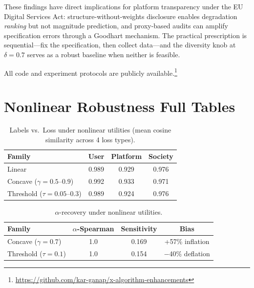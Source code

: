 \documentclass[11pt,letterpaper]{article}
\begin{document}
These findings have direct implications for platform transparency
under the EU Digital Services Act: structure-without-weights
disclosure enables degradation \emph{ranking} but not magnitude
prediction, and proxy-based audits can amplify specification errors
through a Goodhart mechanism. The practical prescription is
sequential---fix the specification, then collect data---and the
diversity knob at $\delta = 0.7$ serves as a robust baseline when
neither is feasible.

All code and experiment protocols are publicly available.\footnote{%
  \url{https://github.com/kar-ganap/x-algorithm-enhancements}}





\appendix

\section{Nonlinear Robustness Full Tables}
\label{app:nonlinear}

\begin{table}[H]
\caption{Labels vs.\ Loss under nonlinear utilities (mean cosine similarity across 4 loss types).}
\label{tab:nonlinear-labels}
\centering\small
\begin{tabular}{lccc}
\toprule
Family & User & Platform & Society \\
\midrule
Linear & 0.989 & 0.929 & 0.976 \\
Concave ($\gamma = 0.5$--$0.9$) & 0.992 & 0.933 & 0.971 \\
Threshold ($\tau = 0.05$--$0.3$) & 0.989 & 0.924 & 0.976 \\
\bottomrule
\end{tabular}
\end{table}

\begin{table}[H]
\caption{$\alpha$-recovery under nonlinear utilities.}
\label{tab:nonlinear-alpha}
\centering\small
\begin{tabular}{lccc}
\toprule
Family & $\alpha$-Spearman & Sensitivity & Bias \\
\midrule
Concave ($\gamma = 0.7$) & 1.0 & 0.169 & +57\% inflation \\
Threshold ($\tau = 0.1$) & 1.0 & 0.154 & $-$40\% deflation \\
\bottomrule
\end{tabular}
\end{table}
\end{document}
